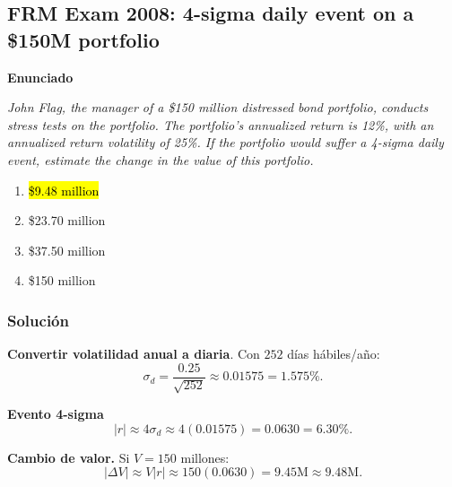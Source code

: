 ﻿\subsection{FRM Exam 2008: 4-sigma daily event on a \$150M portfolio}

\textbf{Enunciado}

\emph{John Flag, the manager of a \$150 million distressed bond portfolio, conducts stress tests on the portfolio.
The portfolio’s annualized return is 12\%, with an annualized return volatility of 25\%.
If the portfolio would suffer a 4-sigma daily event, estimate the change in the value of this portfolio.}
\begin{enumerate}[label=\alph*.]
\item \hl{\$9.48 million}
\item \$23.70 million
\item \$37.50 million
\item \$150 million
\end{enumerate}

\subsubsection*{Solución}


\textbf{Convertir volatilidad anual a diaria}. Con \(252\) días hábiles/año:
\[
\sigma_d=\frac{0.25}{\sqrt{252}}\approx 0.01575=1.575\%.
\]

\textbf{Evento 4-sigma}\\
\[
|r|\approx 4\sigma_d\approx 4(0.01575)=0.0630=6.30\%.
\]

\textbf{Cambio de valor. }Si \(V=150\) millones:
\[
|\Delta V|\approx V|r|\approx 150(0.0630)=9.45\text{M}\approx 9.48\text{M}.
\]











